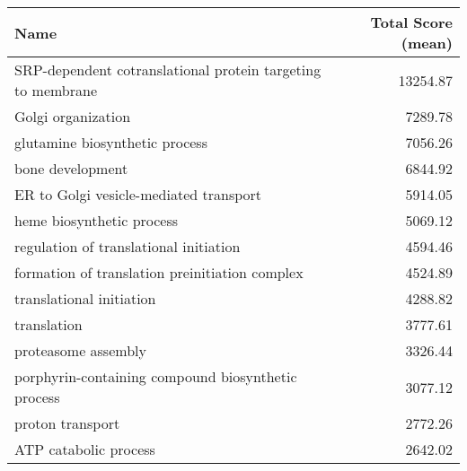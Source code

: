 \begin{table}[h]
\begin{center} \sf
\begin{tabular}{p{}r}
\toprule
\textbf{Name}                                                 & \textbf{Total Score (mean)} \\ \midrule
SRP-dependent cotranslational protein targeting to membrane   & 13254.87                    \\ %
Golgi organization                                            & 7289.78                     \\ %
glutamine biosynthetic process                                & 7056.26                     \\
bone development                                              & 6844.92                     \\ %
ER to Golgi vesicle-mediated transport                        & 5914.05                     \\
heme biosynthetic process                                     & 5069.12                     \\ %
regulation of translational initiation                        & 4594.46                     \\ %
formation of translation preinitiation complex                & 4524.89                     \\ %
translational initiation                                      & 4288.82                     \\
translation                                                   & 3777.61                     \\
proteasome assembly                                           & 3326.44                     \\ %
porphyrin-containing compound biosynthetic process            & 3077.12                     \\ %
proton transport                                              & 2772.26                     \\ %
ATP catabolic process                                         & 2642.02                     \\ %

\end{tabular}
\end{center}
\end{table}
